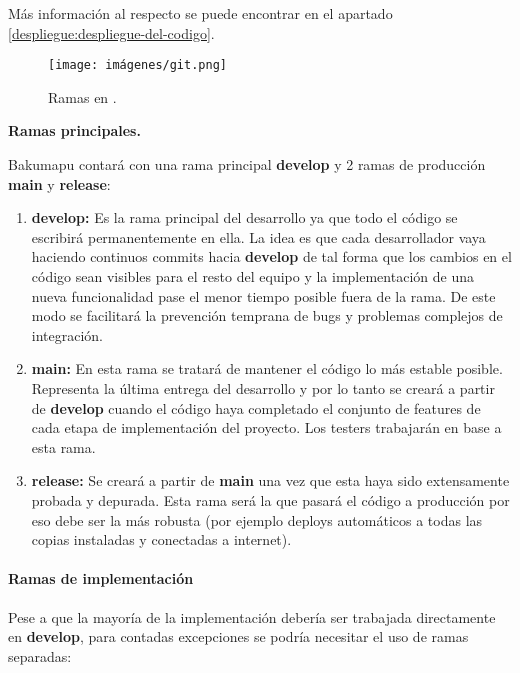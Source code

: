 Más información al respecto se puede encontrar en el apartado \ref{despliegue:despliegue-del-codigo}.

\begin{figure}[H]
	\centering
	\texttt{[image: imágenes/git.png]}
	\caption{Ramas en .}
\end{figure}

\noindent\textbf{Ramas principales.}\label{flujo:ramas-principales}

\noindent Bakumapu contará con una rama principal \textbf{develop} y 2 ramas de producción \textbf{main} y \textbf{release}:

\begin{enumerate}
	\renewcommand{\labelenumi}{\alph{enumi}.}
	\item \textbf{develop:} Es la rama principal del desarrollo ya que todo el código se escribirá permanentemente en ella. La idea es que cada desarrollador vaya haciendo continuos commits hacia \textbf{develop} de tal forma que los cambios en el código sean visibles para el resto del equipo y la implementación de una nueva funcionalidad pase el menor tiempo posible fuera de la rama. De este modo se facilitará la prevención temprana de bugs y problemas complejos de integración.
	
	\item \textbf{main:} En esta rama se tratará de mantener el código lo más estable posible. Representa la última entrega del desarrollo y por lo tanto se creará a partir de \textbf{develop} cuando el código haya completado el conjunto de features de cada etapa de implementación del proyecto. Los testers trabajarán en base a esta rama.
	
	\item \textbf{release:} Se creará a partir de \textbf{main} una vez que esta haya sido extensamente probada y depurada. Esta rama será la que pasará el código a producción por eso debe ser la más robusta (por ejemplo deploys automáticos a todas las copias instaladas y conectadas a internet).
\end{enumerate}

\paragraph{Ramas de implementación}\label{pg:ramas-de-implementacion}

Pese a que la mayoría de la implementación debería ser trabajada directamente en \textbf{develop}, para contadas excepciones se podría necesitar el uso de ramas separadas:

